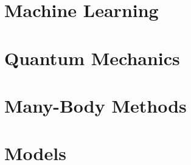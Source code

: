 \chapter{Machine Learning}

\chapter{Quantum Mechanics}

\chapter{Many-Body Methods}

\chapter{Models}

%
